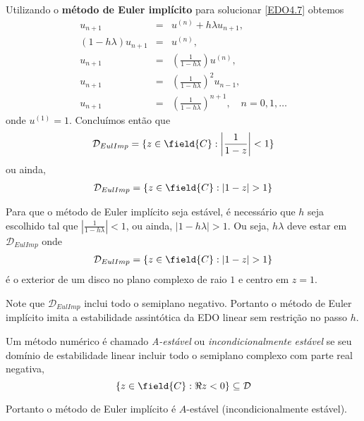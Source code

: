 \begin{ex}
Utilizando o \textbf{método de Euler implícito} para solucionar \eqref{EDO4.7} obtemos
\begin{eqnarray}
 u_{n+1}      &=& u^{(n)}+h\lambda u_{n+1}, \\
 (1-h\lambda )u_{n+1} & =& u^{(n)}, \\
       u_{n+1} & =& \left(\frac{1}{1- h\lambda }\right)u^{(n)}, \\
       u_{n+1} & =& \left(\frac{1}{1- h\lambda }\right)^2u_{n-1}, \\
       u_{n+1} & =& \left(\frac{1}{1- h\lambda }\right)^{n+1}, \quad  n=0,1,\ldots
\end{eqnarray}
onde $u^{(1)}=1$.
Concluímos então que
\begin{eqnarray}
 \mathcal D_{EulImp} = \{z \in  \field{C}:  \left|\frac{1}{1- z}\right|<1\}
\end{eqnarray}
ou ainda,
\begin{eqnarray}
 \mathcal D_{EulImp} = \{z \in  \field{C}:  |1- z|>1\}
\end{eqnarray}

Para que o método de Euler implícito seja estável, é necessário que $h$ seja escolhido tal que $\left|\frac{1}{1- h\lambda }\right|<1$, ou ainda, $|1-h\lambda |>1$. Ou seja, $h\lambda $ deve estar em $\mathcal D_{EulImp}$ onde
\begin{eqnarray}
 \mathcal D_{EulImp} = \{z \in  \field{C}: |1-z|>1\}
\end{eqnarray}
é o exterior de um disco no plano complexo de raio $1$ e centro em $z=1$.

Note que $\mathcal D_{EulImp}$ inclui todo o semiplano negativo. Portanto o método de Euler implícito imita a estabilidade assintótica da EDO linear sem restrição no passo $h$.

\end{ex}

\begin{defn}
Um método numérico é chamado \emph{A-estável} ou \emph{incondicionalmente estável} se seu domínio de estabilidade linear incluir todo o semiplano complexo com parte real negativa,
\begin{equation}     \{z \in \field{C}: \Re{z}<0\} \subseteq \mathcal D \end{equation}
\end{defn}


Portanto o método de Euler implícito é $A$-estável (incondicionalmente estável).






